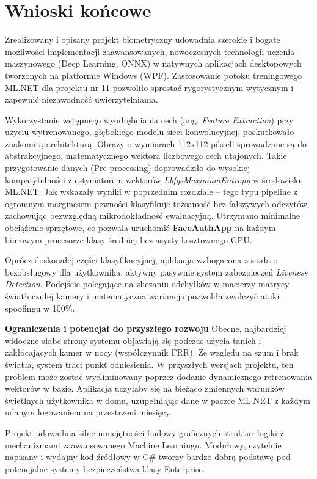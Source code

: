 \chapter{Wnioski końcowe}

Zrealizowany i opisany projekt biometryczny udowadnia szerokie i bogate możliwości implementacji zaawansowanych, nowoczesnych technologii uczenia maszynowego (Deep Learning, ONNX) w natywnych aplikacjach desktopowych tworzonych na platformie Windows (WPF). Zastosowanie potoku treningowego ML.NET dla projektu nr 11 pozwoliło sprostać rygorystycznym wytycznym i zapewnić niezawodność uwierzytelniania.

Wykorzystanie wstępnego wyodrębniania cech (ang. \textit{Feature Extraction}) przy użyciu wytrenowanego, głębokiego modelu sieci konwolucyjnej, poskutkowało znakomitą architekturą. Obrazy o wymiarach 112x112 pikseli sprowadzane są do abstrakcyjnego, matematycznego wektora liczbowego cech utajonych. Takie przygotowanie danych (Pre-processing) doprowadziło do wysokiej kompatybilności z estymatorem wektorów \textit{LbfgsMaximumEntropy} w środowisku ML.NET. Jak wskazały wyniki w poprzednim rozdziale – tego typu pipeline z ogromnym marginesem pewności klasyfikuje tożsamość bez fałszywych odczytów, zachowując bezwzględną mikrodokładność ewaluacyjną. Utrzymano minimalne obciążenie sprzętowe, co pozwala uruchomić \textbf{FaceAuthApp} na każdym biurowym procesorze klasy średniej bez asysty kosztownego GPU.

Oprócz doskonałej części klasyfikacyjnej, aplikacja wzbogacona została o bezobsługowy dla użytkownika, aktywny pasywnie system zabezpieczeń \textit{Liveness Detection}. Podejście polegające na zliczaniu odchyłków w macierzy matrycy światłoczułej kamery i matematyczna wariancja pozwoliła zwalczyć ataki spoofingu w 100\%. 

\textbf{Ograniczenia i potencjał do przyszłego rozwoju}
Obecne, najbardziej widoczne słabe strony systemu objawiają się podczas użycia tanich i zakłócających kamer w nocy (współczynnik FRR). Ze względu na szum i brak światła, system traci punkt odniesienia. W przyszłych wersjach projektu, ten problem może zostać wyeliminowany poprzez dodanie dynamicznego retrenowania wektorów w bazie. Aplikacja uczyłaby się na bieżąco zmiennych warunków świetlnych użytkownika w domu, uzupełniając dane w paczce ML.NET z każdym udanym logowaniem na przestrzeni miesięcy.

Projekt udowadnia silne umiejętności budowy graficznych struktur logiki z mechanizmami zaawansowanego Machine Learningu. Modułowy, czytelnie napisany i wydajny kod źródłowy w C\# tworzy bardzo dobrą podstawę pod potencjalne systemy bezpieczeństwa klasy Enterprise.
